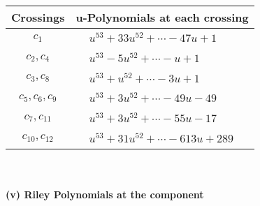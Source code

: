 \documentclass[1p]{elsarticle_modified}
\theoremstyle{definition}
\begin{document}
\begin{tabular}{m{50pt}|m{274pt}}
Crossings & \hspace{64pt}u-Polynomials at each crossing \\
\hline $$\begin{aligned}c_{1}\end{aligned}$$&$\begin{aligned}
&u^{53}+33 u^{52}+\cdots-47 u+1
\end{aligned}$\\
\hline $$\begin{aligned}c_{2},c_{4}\end{aligned}$$&$\begin{aligned}
&u^{53}-5 u^{52}+\cdots- u+1
\end{aligned}$\\
\hline $$\begin{aligned}c_{3},c_{8}\end{aligned}$$&$\begin{aligned}
&u^{53}+u^{52}+\cdots-3 u+1
\end{aligned}$\\
\hline $$\begin{aligned}c_{5},c_{6},c_{9}\end{aligned}$$&$\begin{aligned}
&u^{53}+3 u^{52}+\cdots-49 u-49
\end{aligned}$\\
\hline $$\begin{aligned}c_{7},c_{11}\end{aligned}$$&$\begin{aligned}
&u^{53}+3 u^{52}+\cdots-55 u-17
\end{aligned}$\\
\hline $$\begin{aligned}c_{10},c_{12}\end{aligned}$$&$\begin{aligned}
&u^{53}+31 u^{52}+\cdots-613 u+289
\end{aligned}$\\
\hline
\end{tabular}\\~\\
\newpage\renewcommand{\arraystretch}{1}
\flushleft \textbf{(v) Riley Polynomials at the component}\newline \\
\end{document}
